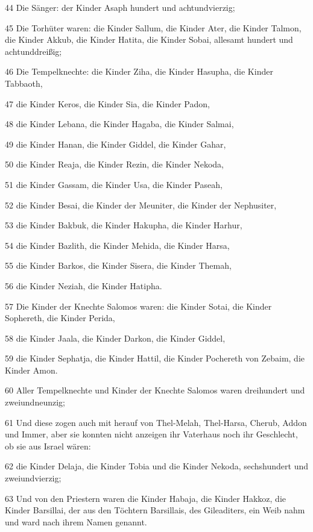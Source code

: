 \par 44 Die Sänger: der Kinder Asaph hundert und achtundvierzig;
\par 45 Die Torhüter waren: die Kinder Sallum, die Kinder Ater, die Kinder Talmon, die Kinder Akkub, die Kinder Hatita, die Kinder Sobai, allesamt hundert und achtunddreißig;
\par 46 Die Tempelknechte: die Kinder Ziha, die Kinder Hasupha, die Kinder Tabbaoth,
\par 47 die Kinder Keros, die Kinder Sia, die Kinder Padon,
\par 48 die Kinder Lebana, die Kinder Hagaba, die Kinder Salmai,
\par 49 die Kinder Hanan, die Kinder Giddel, die Kinder Gahar,
\par 50 die Kinder Reaja, die Kinder Rezin, die Kinder Nekoda,
\par 51 die Kinder Gassam, die Kinder Usa, die Kinder Paseah,
\par 52 die Kinder Besai, die Kinder der Meuniter, die Kinder der Nephusiter,
\par 53 die Kinder Bakbuk, die Kinder Hakupha, die Kinder Harhur,
\par 54 die Kinder Bazlith, die Kinder Mehida, die Kinder Harsa,
\par 55 die Kinder Barkos, die Kinder Sisera, die Kinder Themah,
\par 56 die Kinder Neziah, die Kinder Hatipha.
\par 57 Die Kinder der Knechte Salomos waren: die Kinder Sotai, die Kinder Sophereth, die Kinder Perida,
\par 58 die Kinder Jaala, die Kinder Darkon, die Kinder Giddel,
\par 59 die Kinder Sephatja, die Kinder Hattil, die Kinder Pochereth von Zebaim, die Kinder Amon.
\par 60 Aller Tempelknechte und Kinder der Knechte Salomos waren dreihundert und zweiundneunzig;
\par 61 Und diese zogen auch mit herauf von Thel-Melah, Thel-Harsa, Cherub, Addon und Immer, aber sie konnten nicht anzeigen ihr Vaterhaus noch ihr Geschlecht, ob sie aus Israel wären:
\par 62 die Kinder Delaja, die Kinder Tobia und die Kinder Nekoda, sechshundert und zweiundvierzig;
\par 63 Und von den Priestern waren die Kinder Habaja, die Kinder Hakkoz, die Kinder Barsillai, der aus den Töchtern Barsillais, des Gileaditers, ein Weib nahm und ward nach ihrem Namen genannt.
